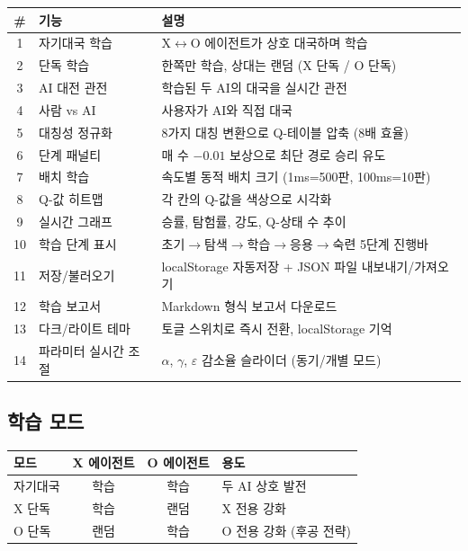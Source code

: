 \documentclass[11pt,a4paper]{article}
\begin{document}
\begin{center}
\renewcommand{\arraystretch}{1.3}
\small
\begin{tabular}{|c|l|p{7cm}|}
\hline
\rowcolor{tableheader}
\textbf{\#} & \textbf{기능} & \textbf{설명} \\
\hline
1 & 자기대국 학습 & X$\leftrightarrow$O 에이전트가 상호 대국하며 학습 \\
\hline
2 & 단독 학습 & 한쪽만 학습, 상대는 랜덤 (X 단독 / O 단독) \\
\hline
3 & AI 대전 관전 & 학습된 두 AI의 대국을 실시간 관전 \\
\hline
4 & 사람 vs AI & 사용자가 AI와 직접 대국 \\
\hline
5 & 대칭성 정규화 & 8가지 대칭 변환으로 Q-테이블 압축 (8배 효율) \\
\hline
6 & 단계 패널티 & 매 수 $-0.01$ 보상으로 최단 경로 승리 유도 \\
\hline
7 & 배치 학습 & 속도별 동적 배치 크기 (1ms=500판, 100ms=10판) \\
\hline
8 & Q-값 히트맵 & 각 칸의 Q-값을 색상으로 시각화 \\
\hline
9 & 실시간 그래프 & 승률, 탐험률, 강도, Q-상태 수 추이 \\
\hline
10 & 학습 단계 표시 & 초기$\to$탐색$\to$학습$\to$응용$\to$숙련 5단계 진행바 \\
\hline
11 & 저장/불러오기 & localStorage 자동저장 + JSON 파일 내보내기/가져오기 \\
\hline
12 & 학습 보고서 & Markdown 형식 보고서 다운로드 \\
\hline
13 & 다크/라이트 테마 & 토글 스위치로 즉시 전환, localStorage 기억 \\
\hline
14 & 파라미터 실시간 조절 & $\alpha$, $\gamma$, $\varepsilon$ 감소율 슬라이더 (동기/개별 모드) \\
\hline
\end{tabular}
\end{center}

\subsection{학습 모드}

\begin{center}
\renewcommand{\arraystretch}{1.4}
\begin{tabular}{|l|c|c|p{5cm}|}
\hline
\rowcolor{tableheader}
\textbf{모드} & \textbf{X 에이전트} & \textbf{O 에이전트} & \textbf{용도} \\
\hline
자기대국 & 학습 & 학습 & 두 AI 상호 발전 \\
\hline
X 단독 & 학습 & 랜덤 & X 전용 강화 \\
\hline
O 단독 & 랜덤 & 학습 & O 전용 강화 (후공 전략) \\
\hline
\end{tabular}
\end{center}
\end{document}
